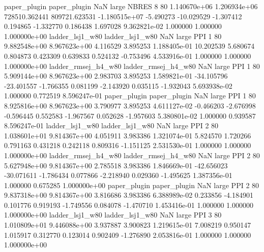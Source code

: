        paper_plugin        paper_plugin                   NaN      large    NBRES                 8 80 1.140670e+06   1.206934e+06 728510.362441  809721.623531 -1.180515e+07     -5.490273    -10.029529    -1.307412       0.194865 -1.332770   0.186438     1.697028   9.362821e-02            1.000000        1.000000        1.000000e+00
    ladder_lsj1_w80     ladder_lsj1_w80                   NaN      large      PPI                 1 80 9.882548e+00   8.967623e+00      4.116529       3.895253  1.188405e-01     10.202539      5.680674     0.804873       0.423309  0.639833   0.524132    -0.753496   4.533916e-01            1.000000        1.000000        1.000000e+00
ladder_rmsej_h4_w80 ladder_rmsej_h4_w80                   NaN      large      PPI                 1 80 5.909144e+00   8.967623e+00      2.983703       3.895253  1.589821e-01    -34.105796    -23.401557    -1.766355       0.081199 -2.143920   0.035115    -1.932043   5.693938e-02            1.000000        0.772519        8.596247e-01
       paper_plugin        paper_plugin                   NaN      large      PPI                 1 80 8.925816e+00   8.967623e+00      3.790977       3.895253  4.611127e-02     -0.466203     -2.676998    -0.596445       0.552583 -1.967567   0.052628    -1.957603   5.380801e-02            1.000000        0.939587        8.596247e-01
    ladder_lsj1_w80     ladder_lsj1_w80                   NaN      large      PPI                 2 80 1.038601e+01   9.814367e+00      4.051911       3.983386  1.321074e-01      5.824570      1.720266     0.791163       0.431218  0.242118   0.809316    -1.151125   2.531530e-01            1.000000        1.000000        1.000000e+00
ladder_rmsej_h4_w80 ladder_rmsej_h4_w80                   NaN      large      PPI                 2 80 5.627948e+00   9.814367e+00      2.785518       3.983386  1.846669e-01    -42.656023    -30.071611    -1.786434       0.077866 -2.218940   0.029360    -1.495625   1.387356e-01            1.000000        0.675285        1.000000e+00
       paper_plugin        paper_plugin                   NaN      large      PPI                 2 80 9.837318e+00   9.814367e+00      3.816686       3.983386  6.388989e-02      0.233856     -4.184901     0.101776       0.919193 -1.749556   0.084078    -1.470710   1.453416e-01            1.000000        1.000000        1.000000e+00
    ladder_lsj1_w80     ladder_lsj1_w80                   NaN      large      PPI                 3 80 1.010809e+01   9.446088e+00      3.937887       3.900823  1.219615e-01      7.008219      0.950147     1.015917       0.312770  0.123014   0.902409    -1.276890   2.053816e-01            1.000000        1.000000        1.000000e+00
